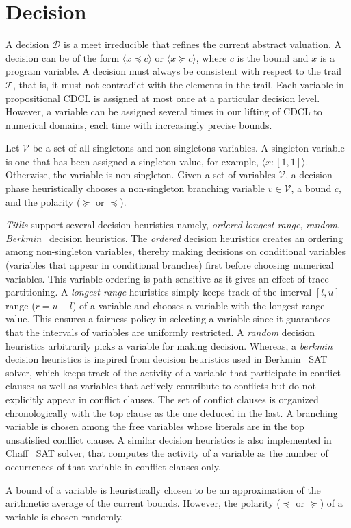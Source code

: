 \section{Decision}
A decision $\mathcal{D}$ is a meet irreducible that refines the 
current abstract valuation.  A decision can be of the form 
$\langle x \preceq c \rangle$ or $\langle x \succeq c \rangle$, 
where $c$ is the bound and $x$ is a program variable.  A 
decision must always be consistent with respect to the 
trail $\mathcal{T}$, that is, it must not contradict with 
the elements in the trail.  Each variable in propositional CDCL 
is assigned at most once at a particular decision level.  However, 
a variable can be assigned several times in our lifting of CDCL to 
numerical domains, each time with increasingly precise bounds.  

Let $\mathcal{V}$ be a set of all singletons and non-singletons 
variables.  A singleton variable is one that has been assigned a 
singleton value, for example, $\langle x:[1,1] \rangle$.  Otherwise, 
the variable is non-singleton.  Given a set of variables $\mathcal{V}$, 
a decision phase heuristically chooses a non-singleton branching 
variable $v \in \mathcal{V}$, a bound $c$, and the polarity ($\succeq$ or 
$\preceq$).  

{\em Titlis} support several decision heuristics namely, {\em ordered} 
{\em longest-range}, {\em random}, {\em Berkmin}~\cite{} decision heuristics.  
The {\em ordered} decision heuristics creates an ordering among non-singleton 
variables, thereby making decisions on conditional variables (variables that 
appear in conditional branches) first before choosing numerical variables.  
This variable ordering is path-sensitive as it gives an effect of trace
partitioning.  A {\em longest-range} heuristics simply keeps track of the
interval $[l,u]$ range ($r=u-l$) of a variable and chooses a variable with 
the longest range value.  This ensures a fairness policy in selecting a 
variable since it guarantees that the intervals of variables are uniformly 
restricted.  A {\em random} decision heuristics arbitrarily picks a variable 
for making decision.  Whereas, a {\em berkmin} decision heuristics is inspired 
from decision heuristics used in Berkmin~\cite{eugoldberg07} SAT solver, which 
keeps track of the activity of a variable that participate in conflict clauses 
as well as variables that actively contribute to conflicts but do not explicitly 
appear in conflict clauses.  The set of conflict clauses is organized 
chronologically with the top clause as the one deduced in the last.  A 
branching variable is chosen among the free variables whose literals are 
in the top unsatisfied conflict clause.  A similar decision heuristics is 
also implemented in Chaff~\cite{chaff} SAT solver, that computes the activity 
of a variable as the number of occurrences of that variable in conflict 
clauses only.  

A bound of a variable is heuristically chosen to be an approximation of the 
arithmetic average of the current bounds.  However, the polarity ($\preceq$ or
$\succeq$) of a variable is chosen randomly.  
